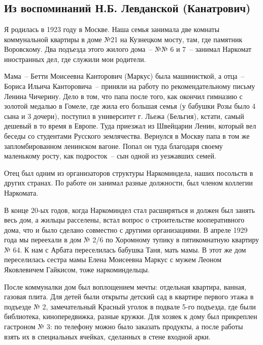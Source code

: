 \chapter{}
\section*{Из воспоминаний Н.Б. Левданской (Канатрович)}

Я родилась  в  1923 году  в  Москве. Наша  семья  занимала  две  комнаты 
коммунальной  квартиры  в  доме  №21  на Кузнецком мосту,  там,  где  памятник 
Воровскому.  Два  подъезда  этого жилого  дома~-- №№  6 и 7~-- занимал Наркомат 
иностранных дел, где служили мои родители.

Мама~-- Бетти  Моисеевна  Канторович  (Маркус)  была  машинисткой, а отца~-- 
Бориса  Ильича  Канторовича~-- приняли  на работу по рекомендательному  письму 
Ленина Чичерину. Дело в том, что папа после того, как окончил гимназию с  золотой 
медалью  в Гомеле,  где жила  его  большая семья (у бабушки Розы было 4 сына и 3 
дочери), поступил в университет  г. Льежа (Бельгия),  кстати, самый  дешевый  в  то 
время  в  Европе.  Туда  приезжал  из  Швейцарии  Ленин,  который  вел  беседы  со 
студентами  Русского  землячества.  Вернулся  в  Москву  папа  в  том  же 
запломбированном ленинском вагоне. Попал  он туда благодаря своему  маленькому 
росту, как подросток~-- сын одной из уезжавших семей.

Отец  был одним  из организаторов структуры Наркоминдела,  наших  посольств 
в других  странах.  По работе он занимал разные должности,  был  членом  коллегии 
Наркомата.

В конце  20-ых годов, когда  Наркоминдел  стал  расширяться  и  должен  был 
занять весь дом,  а жильцы расселены, встал вопрос о строительстве кооперативного 
дома, что и было сделано  совместно с другими организациями.  В апреле  1929  года 
мы переехали в дом № 2/6  по Хоромному тупику  в пятикомнатную квартиру № 64. 
К нам с Арбата переселилась бабушка Таня, мать мамы.  В этот же дом переселилась 
сестра мамы Елена Моисеевна Маркус  с  мужем  Леоном  Яковлевичем Гайкисом, 
тоже наркоминдельцы.

После коммуналки дом был  воплощением мечты: отдельная квартира,  ванная, 
газовая  плита. Для  детей  были открыты детский сад  в  квартире  первого  этажа 
в подъезде № 2, замечательный Красный уголок в подвале  5-го подъезда,  где  были 
библиотека, кинопередвижка,  разные  кружки. Для  хозяек к дому был  прикреплен 
гастроном  № 3: по телефону можно было заказать продукты, а  после работы  взять 
их в специальных ячейках, сделанных в стене входной арки.

